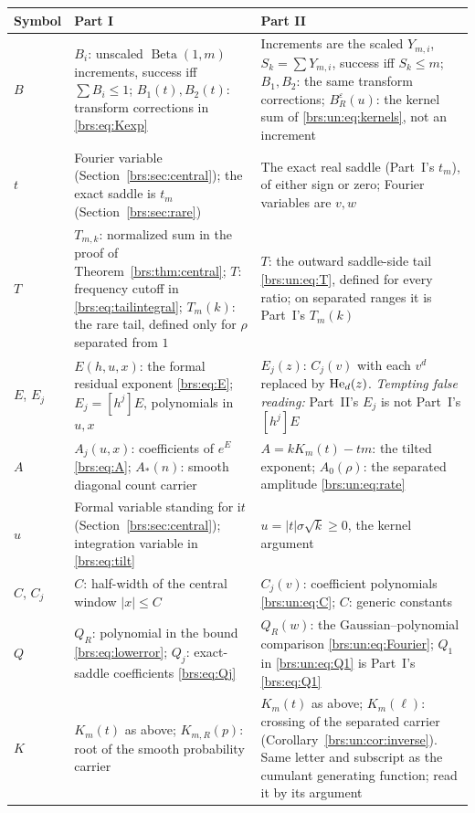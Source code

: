 \documentclass[11pt]{article}
\numberwithin{equation}{section}
\theoremstyle{remark}\newtheorem{remark}[theorem]{Remark}
\newcommand{\ii}{\mathrm i}\newcommand{\sgn}{\operatorname{sgn}}
\begin{document}
\begin{center}
\small
\begin{longtable}{@{}>{\raggedright\arraybackslash}p{} >{\raggedright\arraybackslash}p{} >{\raggedright\arraybackslash}p{}@{}}
\toprule
Symbol & Part I & Part II\\
\midrule
\endhead
$B$ & $B_i$: unscaled $\operatorname{Beta}(1,m)$ increments, success iff $\sum B_i\le1$; $B_1(t),B_2(t)$: transform corrections in \eqref{brs:eq:Kexp} & Increments are the scaled $Y_{m,i}$, $S_k=\sum Y_{m,i}$, success iff $S_k\le m$; $B_1,B_2$: the same transform corrections; $B_R^\varepsilon(u)$: the kernel sum of \eqref{brs:un:eq:kernels}, not an increment\\
$t$ & Fourier variable (Section~\ref{brs:sec:central}); the exact saddle is $t_m$ (Section~\ref{brs:sec:rare}) & The exact real saddle (Part~I's $t_m$), of either sign or zero; Fourier variables are $v,w$\\
$T$ & $T_{m,k}$: normalized sum in the proof of Theorem~\ref{brs:thm:central}; $T$: frequency cutoff in \eqref{brs:eq:tailintegral}; $T_m(k)$: the rare tail, defined only for $\rho$ separated from $1$ & $T$: the outward saddle-side tail \eqref{brs:un:eq:T}, defined for every ratio; on separated ranges it is Part~I's $T_m(k)$\\
$E$, $E_j$ & $E(h,u,x)$: the formal residual exponent \eqref{brs:eq:E}; $E_j=[h^j]E$, polynomials in $u,x$ & $E_j(z)$: $C_j(v)$ with each $v^d$ replaced by $\operatorname{He}_d(z)$. \emph{Tempting false reading:} Part~II's $E_j$ is not Part~I's $[h^j]E$\\
$A$ & $A_j(u,x)$: coefficients of $e^E$ \eqref{brs:eq:A}; $A_*(n)$: smooth diagonal count carrier & $A=kK_m(t)-tm$: the tilted exponent; $A_0(\rho)$: the separated amplitude \eqref{brs:un:eq:rate}\\
$u$ & Formal variable standing for $\ii t$ (Section~\ref{brs:sec:central}); integration variable in \eqref{brs:eq:tilt} & $u=|t|\sigma\sqrt k\ge0$, the kernel argument\\
$C$, $C_j$ & $C$: half-width of the central window $|x|\le C$ & $C_j(v)$: coefficient polynomials \eqref{brs:un:eq:C}; $C$: generic constants\\
$Q$ & $Q_R$: polynomial in the bound \eqref{brs:eq:lowerror}; $Q_j$: exact-saddle coefficients \eqref{brs:eq:Qj} & $Q_R(w)$: the Gaussian--polynomial comparison \eqref{brs:un:eq:Fourier}; $Q_1$ in \eqref{brs:un:eq:Q1} is Part~I's \eqref{brs:eq:Q1}\\
$K$ & $K_m(t)$ as above; $K_{m,R}(p)$: root of the smooth probability carrier & $K_m(t)$ as above; $K_m(\ell)$: crossing of the separated carrier (Corollary~\ref{brs:un:cor:inverse}). Same letter and subscript as the cumulant generating function; read it by its argument\\

\end{longtable}
\end{center}
\end{document}
